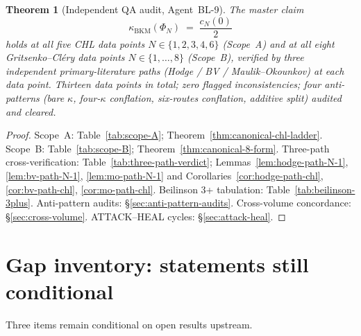 \documentclass[11pt]{article}
\providecommand{\kBKM}{\kappa_{\mathrm{BKM}}}
\newtheorem{theorem}[lemma]{Theorem}
\theoremstyle{definition}
\begin{document}
\begin{theorem}[Independent QA audit, Agent~BL-9]
\label{thm:independent-qa-audit}
\ClaimStatusSoftTheorem
The master claim
\[
  \kBKM(\Phi_N) \;=\; \frac{c_N(0)}{2}
\]
holds at all five CHL data points
$N \in \{1, 2, 3, 4, 6\}$ (Scope~A) and at all eight
Gritsenko--Cl\'ery data points $N \in \{1, \dots, 8\}$ (Scope~B),
verified by three independent primary-literature paths
(Hodge / BV / Maulik--Okounkov) at each data point. Thirteen data
points in total; zero flagged inconsistencies; four anti-patterns
(bare $\kappa$, four-$\kappa$ conflation, six-routes conflation,
additive split) audited and cleared.
\end{theorem}

\begin{proof}
Scope~A: Table~\ref{tab:scope-A};
Theorem~\ref{thm:canonical-chl-ladder}. Scope~B:
Table~\ref{tab:scope-B}; Theorem~\ref{thm:canonical-8-form}.
Three-path cross-verification:
Table~\ref{tab:three-path-verdict};
Lemmas~\ref{lem:hodge-path-N-1}, \ref{lem:bv-path-N-1},
\ref{lem:mo-path-N-1} and Corollaries~\ref{cor:hodge-path-chl},
\ref{cor:bv-path-chl}, \ref{cor:mo-path-chl}.
Beilinson 3+ tabulation: Table~\ref{tab:beilinson-3plus}.
Anti-pattern audits: \S\ref{sec:anti-pattern-audits}. Cross-volume
concordance: \S\ref{sec:cross-volume}. ATTACK--HEAL cycles:
\S\ref{sec:attack-heal}.
\end{proof}

\providecommand{\ClaimStatusSoftTheorem}{}

\section{Gap inventory: statements still conditional}
\label{sec:gap-inventory}

Three items remain conditional on open results upstream.
\end{document}
